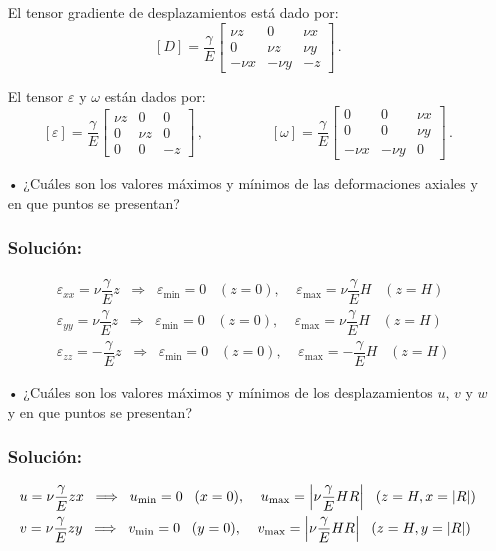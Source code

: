 \documentclass[../notas medios.tex]{subfiles}
\begin{document}
\begin{enumerate}
El tensor gradiente de desplazamientos está dado por: 
\[[D]	=   \dfrac{\gamma}{E}
\begin{bmatrix}
 \nu  z & 0 &  \nu  x\\
 0 &  \nu  z &  \nu  y\\
 - \nu x & - \nu  y &  - z
\end{bmatrix}\, . \]
	
El tensor  $\varepsilon$ y $\omega$ están dados por: 
\[[\varepsilon] = \dfrac{\gamma}{E}
\begin{bmatrix}
  \nu  z & 0 &  0\\
  0 &  \nu  z &  0\\
  0 & 0 &  -  z
\end{bmatrix}\, ,
\hspace{2cm}
[\omega]
= \dfrac{\gamma}{E}
\begin{bmatrix}
  0 & 0 &  \nu x\\
  0 & 0 &  \nu y\\
 -\nu x & -\nu  y &  0
\end{bmatrix}\, . \]

\item[•] ¿Cuáles son los valores máximos y mínimos de las deformaciones 
axiales y en que puntos se presentan? 
	
\subsubsection{Solución:}
\begin{align*}	
&\varepsilon_{xx} =  \nu \dfrac{\gamma}{E} z  \;\; \Longrightarrow  \;\; 
\varepsilon_{\min} = 0  \;\;\; (z=0),  \;\;\;\;  \varepsilon_{\max} = \nu 
\dfrac{\gamma}{E} H \;\;\; (z=H) \\
&\varepsilon_{yy} =  \nu \dfrac{\gamma}{E} z  \;\; \Longrightarrow  \;\; 
\varepsilon_{\min} = 0  \;\;\; (z=0),  \;\;\;\;  \varepsilon_{\max} = \nu 
\dfrac{\gamma}{E} H \;\;\; (z=H)\\
&\varepsilon_{zz} =  - \dfrac{\gamma}{E} z  \;\; \Longrightarrow  \;\; 
\varepsilon_{\min} = 0  \;\;\; (z=0),  \;\;\;\;  \varepsilon_{\max} = - 
\dfrac{\gamma}{E} H \;\;\; (z=H)
\end{align*}

\item[•] ¿Cuáles son los valores máximos y mínimos de los desplazamientos 
$u$, $v$ y $w$ y en que puntos se presentan?

\subsubsection{Solución:}
\begin{align*}
&u =  \nu \dfrac{\gamma}{E} zx  \;\; \Longrightarrow  \;\; u_{\min} = 0  \;\;\; 
(x=0),  \;\;\;\;  u_{\max} =\abs{ \nu \dfrac{\gamma}{E} HR} \;\;\; (z=H, 
x=\abs{R}) \\
&v =  \nu \dfrac{\gamma}{E} zy  \;\; \Longrightarrow  \;\; v_{\min} = 0  \;\;\; 
(y=0),  \;\;\;\;  v_{\max} =\abs{ \nu \dfrac{\gamma}{E} HR} \;\;\; (z=H, 
y=\abs{R})
\end{align*}


\end{enumerate}
\end{document}
